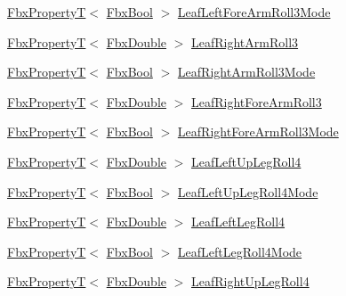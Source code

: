 \begin{DoxyCompactItemize}
\item 
\hyperlink{class_fbx_property_t}{Fbx\+PropertyT}$<$ \hyperlink{fbxtypes_8h_a92e0562b2fe33e76a242f498b362262e}{Fbx\+Bool} $>$ \hyperlink{class_fbx_character_a6b289c53b3986edf68f17a0e8c221e89}{Leaf\+Left\+Fore\+Arm\+Roll3\+Mode}
\item 
\hyperlink{class_fbx_property_t}{Fbx\+PropertyT}$<$ \hyperlink{fbxtypes_8h_a171e72a1c46fc15c1a6c9c31948c1c5b}{Fbx\+Double} $>$ \hyperlink{class_fbx_character_a162b785333125d08fd999c661036288e}{Leaf\+Right\+Arm\+Roll3}
\item 
\hyperlink{class_fbx_property_t}{Fbx\+PropertyT}$<$ \hyperlink{fbxtypes_8h_a92e0562b2fe33e76a242f498b362262e}{Fbx\+Bool} $>$ \hyperlink{class_fbx_character_a7cb8012eb30c350b2a5c1558e8b64dd1}{Leaf\+Right\+Arm\+Roll3\+Mode}
\item 
\hyperlink{class_fbx_property_t}{Fbx\+PropertyT}$<$ \hyperlink{fbxtypes_8h_a171e72a1c46fc15c1a6c9c31948c1c5b}{Fbx\+Double} $>$ \hyperlink{class_fbx_character_a29c4de5bb0939a59979f24f9ee72b3c9}{Leaf\+Right\+Fore\+Arm\+Roll3}
\item 
\hyperlink{class_fbx_property_t}{Fbx\+PropertyT}$<$ \hyperlink{fbxtypes_8h_a92e0562b2fe33e76a242f498b362262e}{Fbx\+Bool} $>$ \hyperlink{class_fbx_character_a554b248d818f38ed7bc22fef96362a65}{Leaf\+Right\+Fore\+Arm\+Roll3\+Mode}
\item 
\hyperlink{class_fbx_property_t}{Fbx\+PropertyT}$<$ \hyperlink{fbxtypes_8h_a171e72a1c46fc15c1a6c9c31948c1c5b}{Fbx\+Double} $>$ \hyperlink{class_fbx_character_aa36e9ed571d7761086ba36df943b2d88}{Leaf\+Left\+Up\+Leg\+Roll4}
\item 
\hyperlink{class_fbx_property_t}{Fbx\+PropertyT}$<$ \hyperlink{fbxtypes_8h_a92e0562b2fe33e76a242f498b362262e}{Fbx\+Bool} $>$ \hyperlink{class_fbx_character_aafff74f9f0579af49724f0fe0550d83f}{Leaf\+Left\+Up\+Leg\+Roll4\+Mode}
\item 
\hyperlink{class_fbx_property_t}{Fbx\+PropertyT}$<$ \hyperlink{fbxtypes_8h_a171e72a1c46fc15c1a6c9c31948c1c5b}{Fbx\+Double} $>$ \hyperlink{class_fbx_character_a9b83334b1cf885a85b9679e267e54093}{Leaf\+Left\+Leg\+Roll4}
\item 
\hyperlink{class_fbx_property_t}{Fbx\+PropertyT}$<$ \hyperlink{fbxtypes_8h_a92e0562b2fe33e76a242f498b362262e}{Fbx\+Bool} $>$ \hyperlink{class_fbx_character_ab3c7bdee28e6e855e6e5ef53ad053689}{Leaf\+Left\+Leg\+Roll4\+Mode}
\item 
\hyperlink{class_fbx_property_t}{Fbx\+PropertyT}$<$ \hyperlink{fbxtypes_8h_a171e72a1c46fc15c1a6c9c31948c1c5b}{Fbx\+Double} $>$ \hyperlink{class_fbx_character_a8074fc6f22e54d9857b7a4404b3e1a38}{Leaf\+Right\+Up\+Leg\+Roll4}

\end{DoxyCompactItemize}
